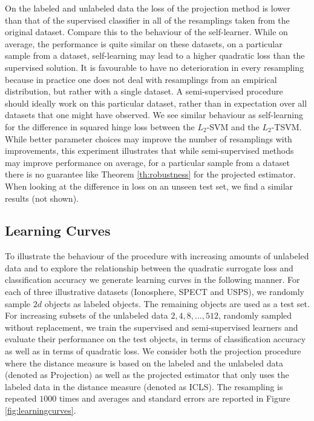 \documentclass[sts,preprint]{imsart-custom}
\begin{document}
On the labeled and unlabeled data the loss of the projection method is lower than that of the supervised classifier in all of the resamplings taken from the original dataset. Compare this to the behaviour of the self-learner. While on average, the performance is quite similar on these datasets, on a particular sample from a dataset, self-learning may lead to a higher quadratic loss than the supervised solution. It is favourable to have no deterioration in every resampling because in practice one does not deal with resamplings from an empirical distribution, but rather with a single dataset. A semi-supervised procedure should ideally work on this particular dataset, rather than in expectation over all datasets that one might have observed. We see similar behaviour as self-learning for the difference in squared hinge loss between the $L_2$-SVM and the $L_2$-TSVM. While better parameter choices may improve the number of resamplings with improvements, this experiment illustrates that while semi-supervised methods may improve performance on average, for a particular sample from a dataset there is no guarantee like Theorem \ref{th:robustness} for the projected estimator. When looking at the difference in loss on an unseen test set, we find a similar results (not shown).

\subsection{Learning Curves}
To illustrate the behaviour of the procedure with increasing amounts of unlabeled data and to explore the relationship between the quadratic surrogate loss and classification accuracy we generate learning curves in the following manner. For each of three illustrative datasets (Ionosphere, SPECT and USPS), we randomly sample $2 d$ objects as labeled objects. The remaining objects are used as a test set. For increasing subsets of the unlabeled data $2,4,8,\dots,512$, randomly sampled without replacement, we train the supervised and semi-supervised learners and evaluate their performance on the test objects, in terms of classification accuracy as well as in terms of quadratic loss. We consider both the projection procedure where the distance measure is based on the labeled and the unlabeled data (denoted as Projection) as well as the projected estimator that only uses the labeled data in the distance measure (denoted as ICLS). The resampling is repeated $1000$ times and averages and standard errors are reported in Figure \ref{fig:learningcurves}.
\end{document}
